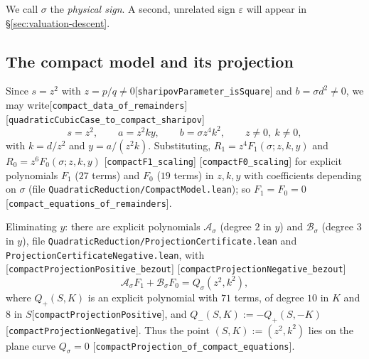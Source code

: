 \documentclass[10pt]{article}
\theoremstyle{definition}
\theoremstyle{remark}
\newcommand{\leanref}[1]{{\scriptsize\textup{[\texttt{#1}]}}\allowbreak}
\newcommand{\leanfile}[1]{\texttt{\small #1}}
\begin{document}
We call $\sigma$ the \emph{physical sign}.  A second, unrelated sign
$\varepsilon$ will appear in \S\ref{sec:valuation-descent}.

\subsection{The compact model and its projection}\label{sec:compact}

Since $s=z^2$ with $z=p/q\ne0$\leanref{sharipov\allowbreak Parameter\_\allowbreak is\allowbreak Square} and
$b=\sigma d^2\ne0$, we may write\leanref{compact\_\allowbreak data\_\allowbreak of\_\allowbreak remainders} \leanref{quadratic\allowbreak Cubic\allowbreak Case\_\allowbreak to\_\allowbreak compact\_\allowbreak sharipov}
\[
 s=z^2,\qquad a=z^2ky,\qquad b=\sigma z^4k^2,\qquad z\ne0,\ k\ne0,
\]
with $k=d/z^2$ and $y=a/(z^2k)$.  Substituting,
$R_1=z^4F_1(\sigma;z,k,y)$ and $R_0=z^6F_0(\sigma;z,k,y)$
\leanref{compact\allowbreak F1\_\allowbreak scaling} \leanref{compact\allowbreak F0\_\allowbreak scaling} for explicit
polynomials $F_1$ ($27$ terms) and $F_0$ ($19$ terms) in $z,k,y$ with
coefficients depending on $\sigma$ (file \leanfile{Quadratic\allowbreak Reduction/\allowbreak Compact\allowbreak Model.\allowbreak lean});
so $F_1=F_0=0$\leanref{compact\_\allowbreak equations\_\allowbreak of\_\allowbreak remainders}.

Eliminating $y$: there are explicit polynomials $\mathcal{A}_\sigma$
(degree $2$ in $y$) and $\mathcal{B}_\sigma$ (degree $3$ in $y$), file
\leanfile{Quadratic\allowbreak Reduction/\allowbreak Projection\allowbreak Certificate.\allowbreak lean} and
\leanfile{Projection\allowbreak Certificate\allowbreak Negative.\allowbreak lean}, with
\leanref{compact\allowbreak Projection\allowbreak Positive\_\allowbreak bezout} \leanref{compact\allowbreak Projection\allowbreak Negative\_\allowbreak bezout}
\[
 \mathcal{A}_\sigma F_1+\mathcal{B}_\sigma F_0=Q_\sigma(z^2,k^2),
\]
where $Q_+(S,K)$ is an explicit polynomial with $71$ terms, of degree $10$ in
$K$ and $8$ in $S$\leanref{compact\allowbreak Projection\allowbreak Positive}, and
$Q_-(S,K):=-Q_+(S,-K)$\leanref{compact\allowbreak Projection\allowbreak Negative}.  Thus the point
$(S,K):=(z^2,k^2)$ lies on the plane curve $Q_\sigma=0$
\leanref{compact\allowbreak Projection\_\allowbreak of\_\allowbreak compact\_\allowbreak equations}.
\end{document}
